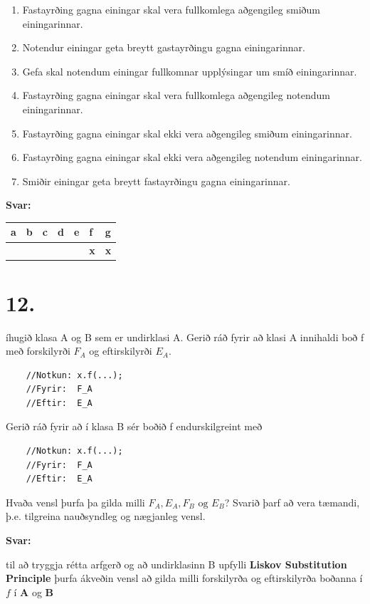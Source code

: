 \documentclass{article}
\newcommand{\sv}{\textbf{Svar:}}
\newcommand{\bo}[1]{\textbf{#1}}
\newcommand{\enum}{\begin{enumerate}[label = \alph*.]}
\begin{document}
    \enum
    \item Fastayrðing gagna einingar skal vera fullkomlega aðgengileg smiðum einingarinnar.
    \item Notendur einingar geta breytt gastayrðingu gagna einingarinnar.
    \item Gefa skal notendum einingar fullkomnar upplýsingar um smíð einingarinnar.
    \item Fastayrðing gagna einingar skal vera fullkomlega aðgengileg notendum einingarinnar.
    \item Fastayrðing gagna einingar skal ekki vera aðgengileg smiðum einingarinnar.
    \item Fastayrðing gagna einingar skal ekki vera aðgengileg notendum einingarinnar.
    \item Smiðir einingar geta breytt fastayrðingu gagna einingarinnar.
\end{enumerate}


    \sv

    
\begin{tabularx}{\textwidth}{ |X|X|X|X|X|X|X|}
    \hline
    \textbf{a}  & \textbf{b}  & \textbf{c}  & \textbf{d}  & \textbf{e}  & \textbf{f}  & \textbf{g} \\ \hline
     & & & & & \bo{x} & \bo{x} \\ \hline
 \end{tabularx}


 \newpage

 \section{12.}

 íhugið klasa A og B sem er undirklasi A. Gerið ráð fyrir að klasi A innihaldi boð f með forskilyrði $F_A$ og eftirskilyrði $E_A$.
 \begin{verbatim}
    //Notkun: x.f(...);
    //Fyrir:  F_A
    //Eftir:  E_A
 \end{verbatim}

 Gerið ráð fyrir að í klasa B sér boðið f endurskilgreint með
 \begin{verbatim}
    //Notkun: x.f(...);
    //Fyrir:  F_A
    //Eftir:  E_A
 \end{verbatim}

 Hvaða vensl þurfa þa gilda milli $F_A, E_A, F_B \text{ og } E_B$? Svarið þarf að
 vera tæmandi, þ.e. tilgreina nauðsyndleg og nægjanleg vensl.

 \sv
 
 til að tryggja rétta arfgerð og að undirklasinn B upfylli \bo{Liskov Substitution Principle}
 þurfa ákveðin vensl að gilda milli forskilyrða og eftirskilyrða boðanna í $f$ í \bo{A} og \bo{B}
\end{document}
